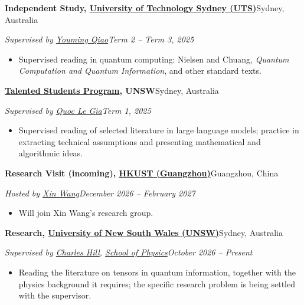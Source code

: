 \documentclass[11pt,a4paper]{article}
\newcommand{\cventry}[4]{%
  \textbf{#1}\hfill #2\par
  \vspace{1pt}%
  \textit{#3}\hfill \textit{#4}\par}
\begin{document}
\vspace{4pt}

\cventry
  {Independent Study, \href{https://www.uts.edu.au}{University of Technology Sydney (UTS)}}
  {Sydney, Australia}
  {Supervised by \href{https://sites.google.com/site/jimmyqiao86/}{Youming Qiao}}
  {Term 2 – Term 3, 2025}

\begin{itemize}
  \item Supervised reading in quantum computing: Nielsen and Chuang, \textit{Quantum Computation and Quantum Information}, and other standard texts.
\end{itemize}

\vspace{4pt}

\cventry
  {\href{https://www.unsw.edu.au/science/student-life-resources/student-opportunities/talented-students-program}{Talented Students Program}, UNSW}
  {Sydney, Australia}
  {Supervised by \href{https://research.unsw.edu.au/people/dr-quoc-thong-le-gia}{Quoc Le Gia}}
  {Term 1, 2025}

\begin{itemize}
  \item Supervised reading of selected literature in large language models; practice in extracting technical assumptions and presenting mathematical and algorithmic ideas.
\end{itemize}

\vspace{4pt}

\cventry
  {Research Visit (incoming), \href{https://www.hkust-gz.edu.cn}{HKUST (Guangzhou)}}
  {Guangzhou, China}
  {Hosted by \href{https://www.xinwang.info/}{Xin Wang}}
  {December 2026 – February 2027}

\begin{itemize}
  \item Will join Xin Wang's research group.
\end{itemize}

\vspace{4pt}

\cventry
  {Research, \href{https://www.unsw.edu.au}{University of New South Wales (UNSW)}}
  {Sydney, Australia}
  {Supervised by \href{https://www.unsw.edu.au/staff/charles-hill}{Charles Hill}, \href{https://www.unsw.edu.au/science/our-schools/physics}{School of Physics}}
  {October 2026 – Present}

\begin{itemize}
  \item Reading the literature on tensors in quantum information, together with the physics background it requires; the specific research problem is being settled with the supervisor.
\end{itemize}
\end{document}
